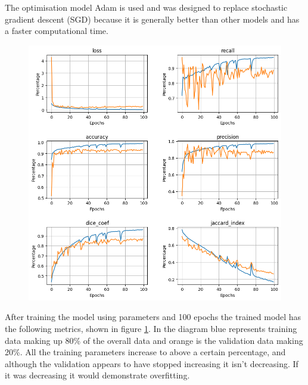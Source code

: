 The optimisation model Adam is used and was designed to replace stochastic gradient descent (SGD) because it is generally better than other models and has a faster computational time. 

\begin{figure}[]
    \centering
    \includegraphics[scale=0.7]{images/segmentation/SegNet-results.png}
    \caption{}\label{SegNet-results}
\end{figure}

After training the model using parameters and 100 epochs the trained model has the following metrics, shown in figure \ref{SegNet-results}. In the diagram blue represents training data making up 80\% of the overall data and orange is the validation data making 20\%. All the training parameters increase to above a certain percentage, and although the validation appears to have stopped increasing it isn't decreasing. If it was decreasing it would demonstrate overfitting.

